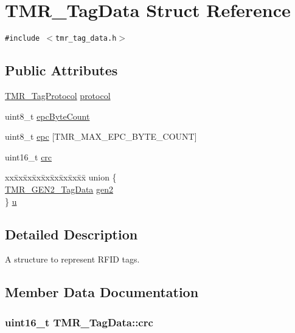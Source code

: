 \hypertarget{struct_t_m_r___tag_data}{
\section{TMR\_\-TagData Struct Reference}
\label{struct_t_m_r___tag_data}
}
{\tt \#include $<$tmr\_\-tag\_\-data.h$>$}

\subsection*{Public Attributes}
\begin{CompactItemize}
\item 
\hyperlink{tmr__tag__protocol_8h_1e727f69e94ccc81da4d3b9440aba934}{TMR\_\-TagProtocol} \hyperlink{struct_t_m_r___tag_data_2e68f5026358cf4f83694ea89d926b66}{protocol}
\item 
uint8\_\-t \hyperlink{struct_t_m_r___tag_data_35dd257d58a4d5a3f4e4178a6f961f77}{epcByteCount}
\item 
uint8\_\-t \hyperlink{struct_t_m_r___tag_data_4f93cf257db348393277b792004d8923}{epc} \mbox{[}TMR\_\-MAX\_\-EPC\_\-BYTE\_\-COUNT\mbox{]}
\item 
uint16\_\-t \hyperlink{struct_t_m_r___tag_data_d8dafe51e5af4f7476122780d2cb4509}{crc}
\item 
\begin{tabbing}
xx\=xx\=xx\=xx\=xx\=xx\=xx\=xx\=xx\=\kill
union \{\\
\>\hyperlink{struct_t_m_r___g_e_n2___tag_data}{TMR\_GEN2\_TagData} \hyperlink{struct_t_m_r___tag_data_2fb9c8ed3770aa54ec3b266a98dc9361}{gen2}\\
\} \hyperlink{struct_t_m_r___tag_data_37f17300bc0e1089399f25866676404e}{u}\\

\end{tabbing}\end{CompactItemize}


\subsection{Detailed Description}
A structure to represent RFID tags. 

\subsection{Member Data Documentation}
\hypertarget{struct_t_m_r___tag_data_d8dafe51e5af4f7476122780d2cb4509}{
\subsubsection[{crc}]{\setlength{\rightskip}{0pt plus 5cm}uint16\_\-t {\bf TMR\_\-TagData::crc}}}
\label{struct_t_m_r___tag_data_d8dafe51e5af4f7476122780d2cb4509}


